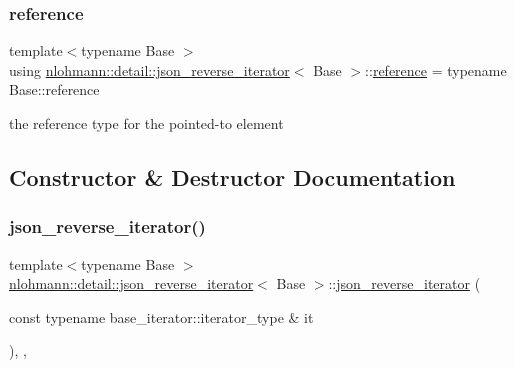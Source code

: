 \mbox{\label{classnlohmann_1_1detail_1_1json__reverse__iterator_a42f51a69bac7b2aebb613b2164e457f1}} 
\subsubsection{\texorpdfstring{reference}{reference}}
{\footnotesize\ttfamily template$<$typename Base $>$ \\
using \hyperlink{classnlohmann_1_1detail_1_1json__reverse__iterator}{nlohmann\+::detail\+::json\+\_\+reverse\+\_\+iterator}$<$ Base $>$\+::\hyperlink{classnlohmann_1_1detail_1_1json__reverse__iterator_a42f51a69bac7b2aebb613b2164e457f1}{reference} =  typename Base\+::reference}



the reference type for the pointed-\/to element 



\subsection{Constructor \& Destructor Documentation}
\mbox{\label{classnlohmann_1_1detail_1_1json__reverse__iterator_a0246de16ece16293f2917dfa5d96e278}} 
\subsubsection{\texorpdfstring{json\+\_\+reverse\+\_\+iterator()}{json\_reverse\_iterator()}\hspace{0.1cm}{\footnotesize\ttfamily [1/2]}}
{\footnotesize\ttfamily template$<$typename Base $>$ \\
\hyperlink{classnlohmann_1_1detail_1_1json__reverse__iterator}{nlohmann\+::detail\+::json\+\_\+reverse\+\_\+iterator}$<$ Base $>$\+::\hyperlink{classnlohmann_1_1detail_1_1json__reverse__iterator}{json\+\_\+reverse\+\_\+iterator} (\begin{DoxyParamCaption}\item[{const typename base\+\_\+iterator\+::iterator\+\_\+type \&}]{it }\end{DoxyParamCaption})\hspace{0.3cm}{\ttfamily [inline]}, {\ttfamily [explicit]}, {\ttfamily [noexcept]}}



